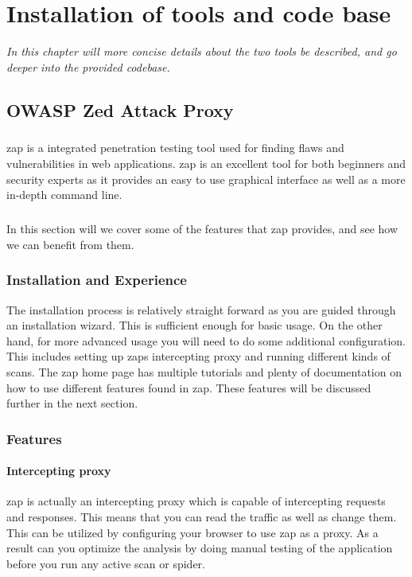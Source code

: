 \documentclass[11pt,english,a4paper]{report}
\begin{document}
\chapter{Installation of tools and code base}
\textit{In this chapter will more concise details about the two tools be described, and go deeper into the provided codebase.}

\section{OWASP Zed Attack Proxy}
\paragraph{}
\gls{zap} is a integrated penetration testing tool used for finding flaws and vulnerabilities in web applications. 
\gls{zap} is an excellent tool for both beginners and security experts as it provides an easy to use graphical interface as well as a more in-depth command line.

\paragraph{}
In this section will we cover some of the features that \gls{zap} provides, and see how we can benefit from them.

\subsection{Installation and Experience}
The installation process is relatively straight forward as you are guided through an installation wizard. 
This is sufficient enough for basic usage. 
On the other hand, for more advanced usage you will need to do some additional configuration. 
This includes setting up \glspl{zap} intercepting proxy and running different kinds of scans. 
The \gls{zap} home page has multiple tutorials and plenty of documentation on how to use different features found in \gls{zap}. 
These features will be discussed further in the next section.

\subsection{Features}
\subsubsection{Intercepting proxy}
\gls{zap} is actually an intercepting proxy which is capable of intercepting requests and responses.
This means that you can read the traffic as well as change them.
This can be utilized by configuring your browser to use \gls{zap} as a proxy.
As a result can you optimize the analysis by doing manual testing of the application before you run any active scan or spider.
\end{document}
